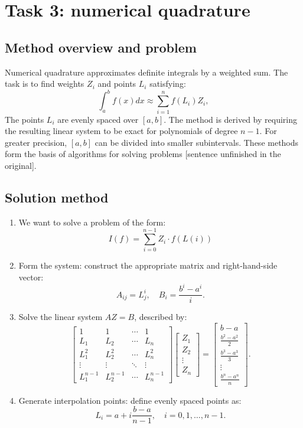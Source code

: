\section{Task 3: numerical quadrature}
\subsection{Method overview and problem}
Numerical quadrature approximates definite integrals by a weighted sum. The task is to find weights \( Z_i \) and points \( L_i \) satisfying:
\[
\int_a^b f(x)dx \approx \sum_{i=1}^n f(L_i)Z_i,
\]
The points \( L_i \) are evenly spaced over \([a, b]\). The method is derived by requiring the resulting linear system to be exact for polynomials of degree \( n-1 \). For greater precision, \([a, b]\) can be divided into smaller subintervals. These methods form the basis of algorithms for solving problems [sentence unfinished in the original].

\subsection{Solution method}
\begin{enumerate}

\item We want to solve a problem of the form:
\[
    I(f) = \sum_{i = 0}^{n-1} Z_i \cdot f(L(i))  
\]
\item Form the system: construct the appropriate matrix and right-hand-side vector: \[
A_{ij} = L_j^i, \quad B_i = \frac{b^i - a^i}{i}.
\]
\item Solve the linear system \( AZ = B \), described by: \[
\begin{bmatrix}
1 & 1 & \cdots & 1 \\
L_1 & L_2 & \cdots & L_n \\
L_1^2 & L_2^2 & \cdots & L_n^2 \\
\vdots & \vdots & \ddots & \vdots \\
L_1^{n-1} & L_2^{n-1} & \cdots & L_n^{n-1}
\end{bmatrix}
\begin{bmatrix}
Z_1 \\
Z_2 \\
\vdots \\
Z_n
\end{bmatrix} =
\begin{bmatrix}
b-a \\
\frac{b^2-a^2}{2} \\
\frac{b^3-a^3}{3} \\
\vdots \\
\frac{b^n-a^n}{n}
\end{bmatrix}.
\]\noindent 
\item Generate interpolation points: define evenly spaced points as:
\[
L_i = a + i \frac{b-a}{n-1}, \quad i=0,1,\ldots,n-1.
\]
\end{enumerate}
